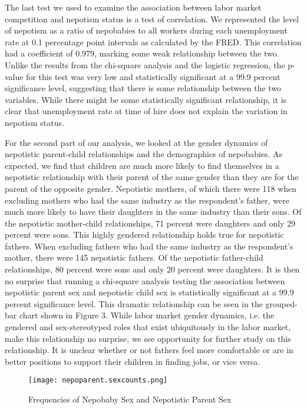 \documentclass[12pt]{article}
\begin{document}
The last test we used to examine the association between labor market competition and nepotism status is a test of correlation. We represented the level of nepotism as a ratio of nepobabies to all workers during each unemployment rate at 0.1 percentage point intervals as calculated by the FRED. This correlation had a coefficient of 0.979, marking some weak relationship between the two. Unlike the results from the chi-square analysis and the logistic regression, the p-value for this test was very low and statistically significant at a 99.9 percent significance level, suggesting that there is some relationship between the two variables. While there might be some statistically significant relationship, it is clear that unemployment rate at time of hire does not explain the variation in nepotism status.

For the second part of our analysis, we looked at the gender dynamics of nepotistic parent-child relationships and the demographics of nepobabies. As expected, we find that children are much more likely to find themselves in a nepotistic relationship with their parent of the same gender than they are for the parent of the opposite gender. Nepotistic mothers, of which there were 118 when excluding mothers who had the same industry as the respondent’s father, were much more likely to have their daughters in the same industry than their sons. Of the nepotistic mother-child relationships, 71 percent were daughters and only 29 percent were sons. This highly gendered relationship holds true for nepotistic fathers. When excluding fathers who had the same industry as the respondent’s mother, there were 145 nepotistic fathers. Of the nepotistic father-child relationships, 80 percent were sons and only 20 percent were daughters. It is then no surprise that running a chi-square analysis testing the association between nepotistic parent sex and nepotistic child sex is statistically significant at a 99.9 percent significance level. This dramatic relationship can be seen in the grouped-bar chart shown in Figure 3. While labor market gender dynamics, i.e. the gendered and sex-stereotyped roles that exist ubiquitously in the labor market, make this relationship no surprise, we see opportunity for further study on this relationship. It is unclear whether or not fathers feel more comfortable or are in better positions to support their children in finding jobs, or vice versa.

\begin{figure}
    \centering
    \texttt{[image: nepoparent.sexcounts.png]}
    \caption{Frequencies of Nepobaby Sex and Nepotistic Parent Sex}
    \label{fig:enter-label}
\end{figure}
\end{document}
